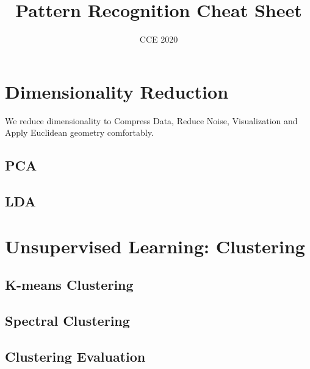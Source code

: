 \documentclass{article}
\title{Pattern Recognition Cheat Sheet}
\author{CCE 2020}
\begin{document}
\maketitle
\tableofcontents

\section{Dimensionality Reduction}
    We reduce dimensionality to Compress Data, 
    Reduce Noise, Visualization and Apply Euclidean geometry comfortably.
    \subsection{PCA}
        
    \subsection{LDA}
        

\section{Unsupervised Learning: Clustering}
    \subsection{K-means Clustering}
        
    \subsection{Spectral Clustering }
        
    \subsection{Clustering Evaluation}
        
    \newpage
\end{document}
